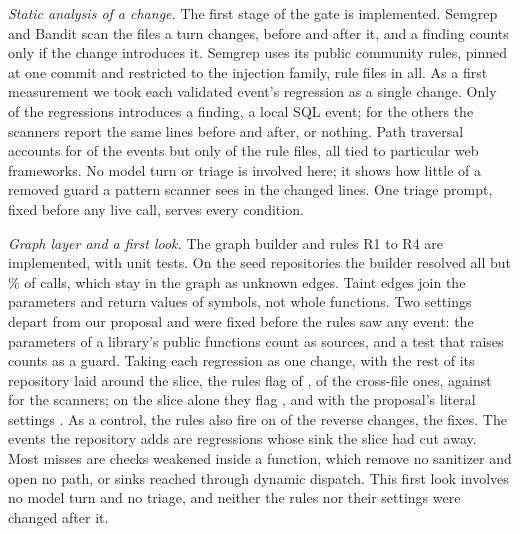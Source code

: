 \documentclass[conference]{IEEEtran}
\begin{document}
\textit{Static analysis of a change.} The first stage of the gate is implemented. Semgrep \nSemgrepVersion{} and Bandit \nBanditVersion{} scan the files a turn changes, before and after it, and a finding counts only if the change introduces it. Semgrep uses its public community rules, pinned at one commit and restricted to the injection family, \nSemgrepRules{} rule files in all. As a first measurement we took each validated event's regression as a single change. Only \nStaticCaught{} of the \nStaticEvents{} regressions introduces a finding, a local SQL event; for the others the scanners report the same lines before and after, or nothing. Path traversal accounts for \nPathEvents{} of the events but only \nPathRules{} of the rule files, all tied to particular web frameworks. No model turn or triage is involved here; it shows how little of a removed guard a pattern scanner sees in the changed lines. One triage prompt, fixed before any live call, serves every condition.

\textit{Graph layer and a first look.} The graph builder and rules R1 to R4 are implemented, with \nGraphTests{} unit tests. On the \nGraphRepos{} seed repositories the builder resolved all but \nUnknownShare{}\% of \nGraphCalls{} calls, which stay in the graph as unknown edges. Taint edges join the parameters and return values of symbols, not whole functions. Two settings depart from our proposal and were fixed before the rules saw any event: the parameters of a library's public functions count as sources, and a test that raises counts as a guard. Taking each regression as one change, with the rest of its repository laid around the slice, the rules flag \nDeltaRepo{} of \nStaticEvents{}, \nDeltaRepoCross{} of the \nEventsCross{} cross-file ones, against \nStaticCaught{} for the scanners; on the slice alone they flag \nDeltaCaught{}, and with the proposal's literal settings \nDeltaProposed{}. As a control, the rules also fire on \nDeltaRepoFixes{} of the reverse changes, the fixes. The events the repository adds are regressions whose sink the slice had cut away. Most misses are checks weakened inside a function, which remove no sanitizer and open no path, or sinks reached through dynamic dispatch. This first look involves no model turn and no triage, and neither the rules nor their settings were changed after it.
\end{document}
